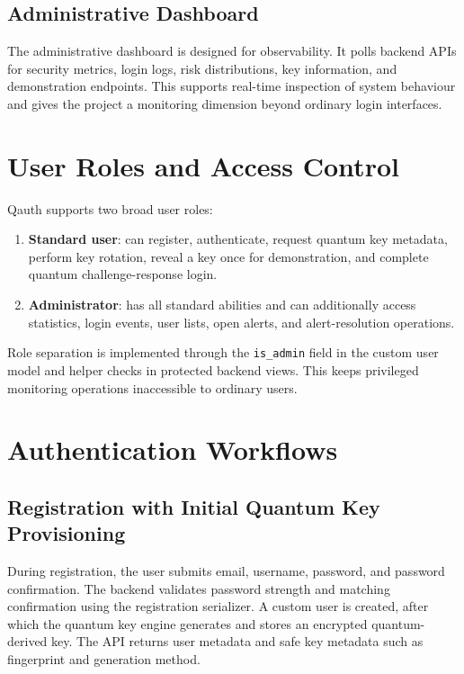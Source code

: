 \subsection{Administrative Dashboard}
The administrative dashboard is designed for observability. It polls backend APIs for security metrics, login logs, risk distributions, key information, and demonstration endpoints. This supports real-time inspection of system behaviour and gives the project a monitoring dimension beyond ordinary login interfaces.

\section{User Roles and Access Control}
Qauth supports two broad user roles:

\begin{enumerate}
    \item \textbf{Standard user}: can register, authenticate, request quantum key metadata, perform key rotation, reveal a key once for demonstration, and complete quantum challenge-response login.
    \item \textbf{Administrator}: has all standard abilities and can additionally access statistics, login events, user lists, open alerts, and alert-resolution operations.
\end{enumerate}

Role separation is implemented through the \texttt{is\_admin} field in the custom user model and helper checks in protected backend views. This keeps privileged monitoring operations inaccessible to ordinary users.

\section{Authentication Workflows}

\subsection{Registration with Initial Quantum Key Provisioning}
During registration, the user submits email, username, password, and password confirmation. The backend validates password strength and matching confirmation using the registration serializer. A custom user is created, after which the quantum key engine generates and stores an encrypted quantum-derived key. The API returns user metadata and safe key metadata such as fingerprint and generation method.

